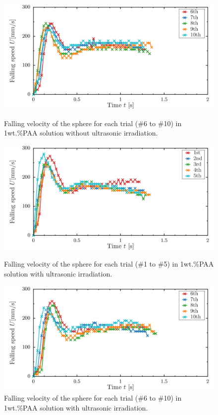 \begin{figure}[ht]
    \centering
    \includegraphics[width=12cm,clip]{X-Appendix/s1-0-6-10.png}
    \caption{Falling velocity of the sphere for each trial (\#6 to \#10) in 1wt.\%PAA solution without ultrasonic irradiation.}
    \label{fig:1-1PAA-falling6-10}
    \centering
    \includegraphics[width=12cm,clip]{X-Appendix/s1-39-1-5.png}
    \caption{Falling velocity of the sphere for each trial (\#1 to \#5) in 1wt.\%PAA solution with ultrasonic irradiation.}
    \label{fig:1-1onPAA-falling1-5}
    \centering
    \includegraphics[width=12cm,clip]{X-Appendix/s1-39-6-10.png}
    \caption{Falling velocity of the sphere for each trial (\#6 to \#10) in 1wt.\%PAA solution with ultrasonic irradiation.}
    \label{fig:1-1onPAA-falling6-10}
\end{figure}

